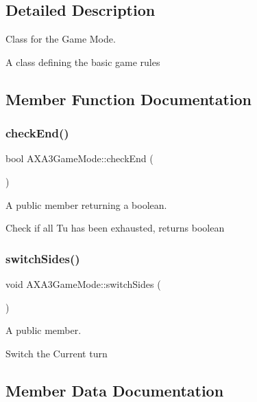 \subsection{Detailed Description}
Class for the Game Mode. 

A class defining the basic game rules 

\subsection{Member Function Documentation}
\hypertarget{class_a_x_a3_game_mode_a0a00cfd9dc6792556a48235fe9b7b151}{}\label{class_a_x_a3_game_mode_a0a00cfd9dc6792556a48235fe9b7b151} 
\subsubsection{\texorpdfstring{check\+End()}{checkEnd()}}
{\footnotesize\ttfamily bool A\+X\+A3\+Game\+Mode\+::check\+End (\begin{DoxyParamCaption}{ }\end{DoxyParamCaption})}



A public member returning a boolean. 

Check if all Tu has been exhausted, returns boolean \hypertarget{class_a_x_a3_game_mode_a5b84f33f7978a2015a870a6daab2ee68}{}\label{class_a_x_a3_game_mode_a5b84f33f7978a2015a870a6daab2ee68} 
\subsubsection{\texorpdfstring{switch\+Sides()}{switchSides()}}
{\footnotesize\ttfamily void A\+X\+A3\+Game\+Mode\+::switch\+Sides (\begin{DoxyParamCaption}{ }\end{DoxyParamCaption})}



A public member. 

Switch the Current turn 

\subsection{Member Data Documentation}
\hypertarget{class_a_x_a3_game_mode_ab240472b5b7ebecb719d972ae3ad1167}{}\label{class_a_x_a3_game_mode_ab240472b5b7ebecb719d972ae3ad1167} 
